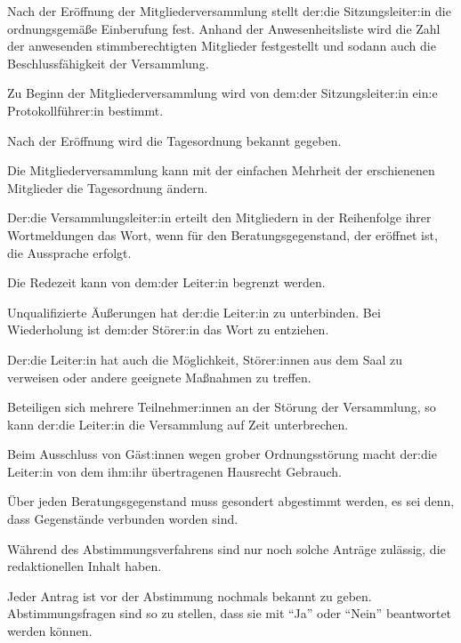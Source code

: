 \begin{gfmitglieder}

  Nach der Eröffnung der Mitgliederversammlung stellt der:die Sitzungsleiter:in die ordnungsgemäße Einberufung fest. Anhand der Anwesenheitsliste wird die Zahl der anwesenden stimmberechtigten Mitglieder festgestellt und sodann auch die Beschlussfähigkeit der Versammlung.

  Zu Beginn der Mitgliederversammlung wird von dem:der Sitzungsleiter:in ein:e Protokollführer:in bestimmt.


  Nach der Eröffnung wird die Tagesordnung bekannt gegeben.

  Die Mitgliederversammlung kann mit der einfachen Mehrheit der erschienenen Mitglieder die Tagesordnung ändern.


  Der:die Versammlungsleiter:in erteilt den Mitgliedern in der Reihenfolge ihrer Wortmeldungen das Wort, wenn für den Beratungsgegenstand, der eröffnet ist, die Aussprache erfolgt.

  Die Redezeit kann von dem:der Leiter:in begrenzt werden.


  Unqualifizierte Äußerungen hat der:die Leiter:in zu unterbinden. Bei Wiederholung ist dem:der Störer:in das Wort zu entziehen.

  Der:die Leiter:in hat auch die Möglichkeit, Störer:innen aus dem Saal zu verweisen oder andere geeignete Maßnahmen zu treffen.

  Beteiligen sich mehrere Teilnehmer:innen an der Störung der Versammlung, so kann der:die Leiter:in die Versammlung auf Zeit unterbrechen.

  Beim Ausschluss von Gäst:innen wegen grober Ordnungsstörung macht der:die Leiter:in von dem ihm:ihr übertragenen Hausrecht Gebrauch.


  Über jeden Beratungsgegenstand muss gesondert abgestimmt werden, es sei denn, dass Gegenstände verbunden worden sind.

  Während des Abstimmungsverfahrens sind nur noch solche Anträge zulässig, die redaktionellen Inhalt haben.

  Jeder Antrag ist vor der Abstimmung nochmals bekannt zu geben. Abstimmungsfragen sind so zu stellen, dass sie mit \enquote{Ja} oder \enquote{Nein} beantwortet werden können.


\end{gfmitglieder}
